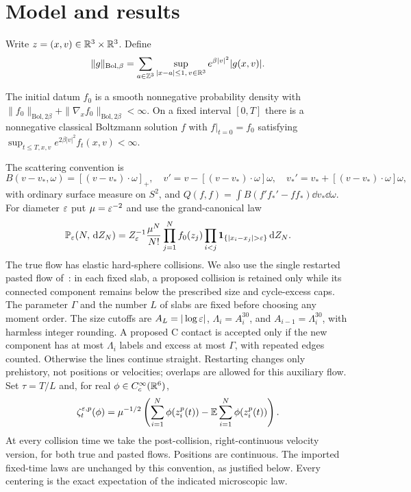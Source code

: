 \section{Model and results}\label{sec:model}
Write $z=(x,v)\in\mathbb R^3\times\mathbb R^3$. Define
\[
 \|g\|_{\mathrm{Bol},\beta}
 =\sum_{a\in\mathbb Z^3}\sup_{|x-a|\leq1,\,v\in\mathbb R^3}
       e^{\beta|v|^2}|g(x,v)|.
\]
\begin{assumption}\label{ass:kinetic}
The initial datum $f_0$ is a smooth nonnegative probability density with
$\|f_0\|_{\mathrm{Bol},2\beta}
+\|\nabla_xf_0\|_{\mathrm{Bol},2\beta}<\infty$.
On a fixed interval $[0,T]$ there is a nonnegative classical Boltzmann
solution $f$ with $f|_{t=0}=f_0$ satisfying
$\sup_{t\leq T,x,v}e^{2\beta|v|^2}f_t(x,v)<\infty$.
\end{assumption}
The scattering convention is
\[
 B(v-v_*,\omega)=[(v-v_*)\cdot\omega]_+,\quad
 v'=v-[(v-v_*)\cdot\omega]\omega,\quad
 v_*'=v_*+[(v-v_*)\cdot\omega]\omega ,
\]
with ordinary surface measure on $S^2$, and
$Q(f,f)=\int B(f'f_*'-ff_*)\dd v_*\dd\omega$.
For diameter $\varepsilon$ put $\mu=\varepsilon^{-2}$ and use the grand-canonical law
\[
 \Pp_\eps(N,\dd Z_N)=
 Z_\eps^{-1}\frac{\mu^N}{N!}
 \prod_{j=1}^Nf_0(z_j)
 \prod_{i<j}\ind_{\{|x_i-x_j|>\eps\}}\dd Z_N .
\]
The true flow has elastic hard-sphere collisions. We also use the single
restarted pasted flow of~\cite[\S3]{U}: in each fixed slab, a proposed
collision is retained only while its connected component remains below
the prescribed size and cycle-excess caps. The parameter $\Gamma$ and
the number $L$ of slabs are fixed before choosing any moment order.
The size cutoffs are $A_L=|\log\varepsilon|$, $\Lambda_i=A_i^{30}$,
and $A_{i-1}=\Lambda_i^{30}$, with harmless integer rounding.
A proposed C contact is accepted only if the new component has at most
$\Lambda_i$ labels and excess at most $\Gamma$, with repeated edges counted.
Otherwise the lines continue straight. Restarting changes only prehistory,
not positions or velocities; overlaps are allowed for this auxiliary flow.
Set $\tau=T/L$ and, for real $\phi\in C_c^\infty(\mathbb R^6)$,
\[
 \zeta_t^{\varepsilon,p}(\phi)=\mu^{-1/2}
 \left(\sum_{i=1}^N\phi(z_i^p(t))
             -\mathbb E\sum_{i=1}^N\phi(z_i^p(t))\right).
\]
At every collision time we take the post-collision, right-continuous
velocity version, for both true and pasted flows. Positions are continuous.
The imported fixed-time laws are unchanged by this convention, as justified
below. Every centering is the exact expectation of the indicated microscopic law.

